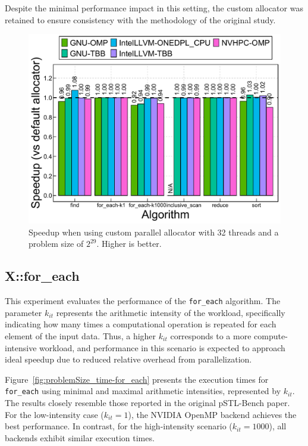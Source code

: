 \documentclass[sigconf]{acmart}
\begin{document}
Despite the minimal performance impact in this setting, the custom allocator
was retained to ensure consistency with the methodology of the original study.

\begin{figure}[H]
      \centering
      \includegraphics[width=\linewidth]{figures/speedup_customAllocator}
      \caption{Speedup when using custom parallel allocator with 32 threads and a problem size of $2^{29}$. Higher is better.}\label{fig:speedup_customAllocator}
\end{figure}

\subsection{X::for\_each}

This experiment evaluates the performance of the \texttt{for\_each} algorithm.
The parameter \( k_{it} \) represents the arithmetic intensity of the workload,
specifically indicating how many times a computational operation is repeated
for each element of the input data. Thus, a higher \( k_{it} \) corresponds to
a more compute-intensive workload, and performance in this scenario is expected
to approach ideal speedup due to reduced relative overhead from
parallelization.

Figure~\ref{fig:problemSize_time-for_each} presents the execution times for
\texttt{for\_each} using minimal and maximal arithmetic intensities,
represented by \( k_{it} \). The results closely resemble those reported in the
original pSTL-Bench paper. For the low-intensity case (\( k_{it} = 1 \)), the
NVIDIA OpenMP backend achieves the best performance. In contrast, for the
high-intensity scenario (\( k_{it} = 1000 \)), all backends exhibit similar
execution times.
\end{document}
